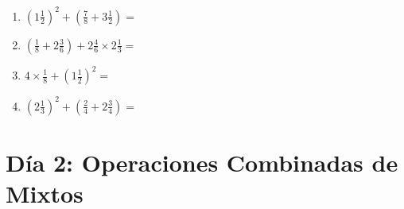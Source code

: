 \documentclass[12pt]{article}
\begin{document}
\begin{enumerate}
\item \large $ (1 \frac{1}{2})^2 + (\frac{7}{8} + 3 \frac{1}{2}) = $ \vspace{1.8cm}
\item \large $ (\frac{1}{8} + 2 \frac{3}{6}) + 2 \frac{4}{6} \times 2 \frac{1}{3} = $ \vspace{1.8cm}
\item \large $ 4 \times \frac{1}{8} + (1 \frac{1}{2})^2 = $ \vspace{1.8cm}
\item \large $ (2 \frac{1}{3})^2 + (\frac{2}{4} + 2 \frac{3}{4}) = $ \vspace{1.8cm}
\end{enumerate}\newpage
\section*{Día 2: Operaciones Combinadas de Mixtos}
\end{document}
